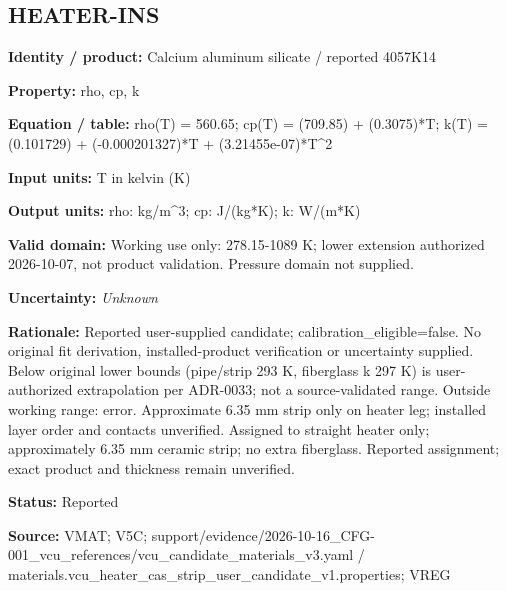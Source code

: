 \documentclass[11pt]{article}
\begin{document}
\par\noindent\begin{minipage}{\textwidth}\small\setlength{\parskip}{2pt}
\subsection*{HEATER-INS}
\textbf{Identity / product:} Calcium aluminum silicate / reported 4057K14\par
\textbf{Property:} rho, cp, k\par
\textbf{Equation / table:} rho(T) = 560.65; cp(T) = (709.85) + (0.3075)*T; k(T) = (0.101729) + (-0.000201327)*T + (3.21455e-07)*T\textasciicircum{}2\par
\textbf{Input units:} T in kelvin (K)\par
\textbf{Output units:} rho: kg/m\textasciicircum{}3; cp: J/(kg*K); k: W/(m*K)\par
\textbf{Valid domain:} Working use only: 278.15-1089 K; lower extension authorized 2026-10-07, not product validation. Pressure domain not supplied.\par
\textbf{Uncertainty:} \textit{Unknown}\par
\textbf{Rationale:} Reported user-supplied candidate; calibration\_\allowbreak{}eligible=false. No original fit derivation, installed-product verification or uncertainty supplied. Below original lower bounds (pipe/strip 293 K, fiberglass k 297 K) is user-authorized extrapolation per ADR-0033; not a source-validated range. Outside working range: error. Approximate 6.35 mm strip only on heater leg; installed layer order and contacts unverified. Assigned to straight heater only; approximately 6.35 mm ceramic strip; no extra fiberglass. Reported assignment; exact product and thickness remain unverified.\par
\textbf{Status:} Reported\par
\textbf{Source:} VMAT; V5C; support/evidence/2026-10-16\_\allowbreak{}CFG-001\_\allowbreak{}vcu\_\allowbreak{}references/vcu\_\allowbreak{}candidate\_\allowbreak{}materials\_\allowbreak{}v3.yaml / materials.vcu\_\allowbreak{}heater\_\allowbreak{}cas\_\allowbreak{}strip\_\allowbreak{}user\_\allowbreak{}candidate\_\allowbreak{}v1.properties; VREG\par
\end{minipage}\par\vspace{5pt}
\end{document}
